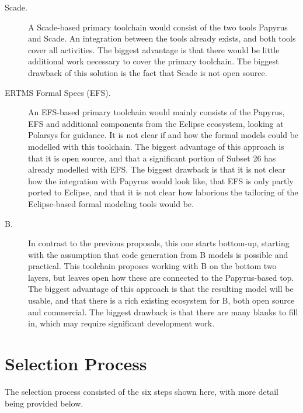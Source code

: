 \begin{description}

\item[Scade.] A Scade-based primary toolchain would consist of the two tools Papyrus and Scade.  An integration between the tools already exists, and both tools cover all activities.  The biggest advantage is that there would be little additional work necessary to cover the primary toolchain.  The biggest drawback of this solution is the fact that Scade is not open source.

\item[ERTMS Formal Specs (EFS).] An EFS-based primary toolchain would mainly consists of the Papyrus, EFS and additional components from the Eclipse ecosystem, looking at Polarsys for guidance.  It is not clear if and how the formal models could be modelled with this toolchain.  The biggest advantage of this approach is that it is open source, and that a significant portion of Subset 26 has already modelled with EFS.  The biggest drawback is that it is not clear how the integration with Papyrus would look like, that EFS is only partly ported to Eclipse, and that it is not clear how laborious the tailoring of the Eclipse-based formal modeling tools would be.

\item[B.] In contrast to the previous proposals, this one starts bottom-up, starting with the assumption that code generation from B models is possible and practical.   This toolchain proposes working with B on the bottom two layers, but leaves open how these are connected to the Papyrus-based top.  The biggest advantage of this approach is that the resulting model will be usable, and that there is a rich existing ecosystem for B, both open source and commercial.  The biggest drawback is that there are many blanks to fill in, which may require significant development work.

\end{description}

\section{Selection Process}

The selection process consisted of the six steps shown here, with more detail being provided below.

